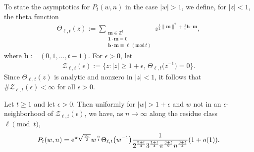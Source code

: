  To state the asymptotics for $P_t(w,n)$ in the case $|w|>1$, we define, for $|z|<1$, the theta function
\begin{align*}
 \Theta_{\ell,t}(z):=\sum_{\substack{\boldsymbol{m}\in \mathbb{Z}^t \\ \boldsymbol{1} \cdot \boldsymbol{m}=0 \\ \boldsymbol{b}\cdot \boldsymbol{m} \equiv \ell \ ({\text{mod}\, {t}}) }} z^{\frac{1}{2}\|\boldsymbol{m}\|^2+\frac{1}{t}\boldsymbol{b}\cdot \boldsymbol{m}},
\end{align*} where $\boldsymbol{b}:=(0,1,\dots,t-1)$. For $\epsilon>0$, let
\begin{align*}
\mathcal{Z}_{\ell,t}(\epsilon):=\bigl\{z : |z|\geq 1+\epsilon, \, \Theta_{\ell,t}\big(z^{-1}\big)=0\bigr\}.
\end{align*}
Since $\Theta_{\ell,t}(z)$ is analytic and nonzero in $|z|<1$, it follows that $\#\mathcal{Z}_{\ell,t}(\epsilon)<\infty$ for all $\epsilon>0$.

\begin{Theorem} \label{|w|>1 Asymptotics}
 Let $t
 \geq 1$ and let $\epsilon>0$. Then uniformly for $|w|>1+\epsilon$ and $w$ not in an $\epsilon$-neighborhood of $\mathcal{Z}_{\ell,t}(\epsilon)$, we have, as $n \to \infty$ along the residue class $\ell \pmod{t}$,
 \begin{align*}
P_t(w,n)= {\rm e}^{\pi \sqrt{\frac{2n}{3}}}w^{\frac{n}{t}} \Theta_{\ell,t}\big(w^{-1}\big)\frac{1}{2^{\frac{5+t}{4}}3^{\frac{1+t}{4}}\pi^{\frac{3+t}{2}}n^{\frac{3+t}{4}}}(1+o(1)).
 \end{align*}
\end{Theorem}
